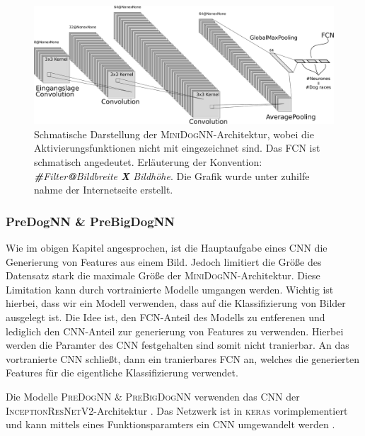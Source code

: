  \begin{figure}
 \centering
 \includegraphics[width=\the\textwidth]{../../final_data/general/MiniDogNN.pdf}
 \caption{Schmatische Darstellung der \textsc{MiniDogNN}-Architektur, wobei
          die Aktivierungsfunktionen nicht mit eingezeichnet sind. Das FCN
          ist schmatisch angedeutet. Erläuterung der Konvention: \emph{\textbf{\#}Filter\textbf{@}Bildbreite \textbf{X} Bildhöhe}.
          Die Grafik wurde unter zuhilfe nahme der Internetseite \cite{net_svg_source} erstellt.}
 \label{fig:MiniDogNN}
 \end{figure}

\subsubsection{PreDogNN \& PreBigDogNN}
Wie im obigen Kapitel angesprochen, ist die Hauptaufgabe eines CNN die Generierung
von Features aus einem Bild. Jedoch limitiert die Größe des Datensatz stark
die maximale Größe der \textsc{MiniDogNN}-Architektur. Diese Limitation
kann durch vortrainierte Modelle umgangen werden. Wichtig ist hierbei, dass wir
ein Modell verwenden, dass auf die Klassifizierung von Bilder ausgelegt ist.
Die Idee ist, den FCN-Anteil des Modells zu entferenen und lediglich den CNN-Anteil
zur generierung von Features zu verwenden. Hierbei werden die Paramter des CNN
festgehalten sind somit nicht tranierbar. An das vortranierte CNN schließt, dann
ein tranierbares FCN an, welches die generierten Features für die eigentliche
Klassifizierung verwendet.

Die Modelle \textsc{PreDogNN \& PreBigDogNN} verwenden das CNN der
\textsc{InceptionResNetV2}-Architektur \cite{InceptionResNetV2}. Das Netzwerk
ist in \textsc{keras} vorimplementiert und kann mittels eines Funktionsparamters
ein CNN umgewandelt werden \cite{keras_InceptionResNetV2}.

